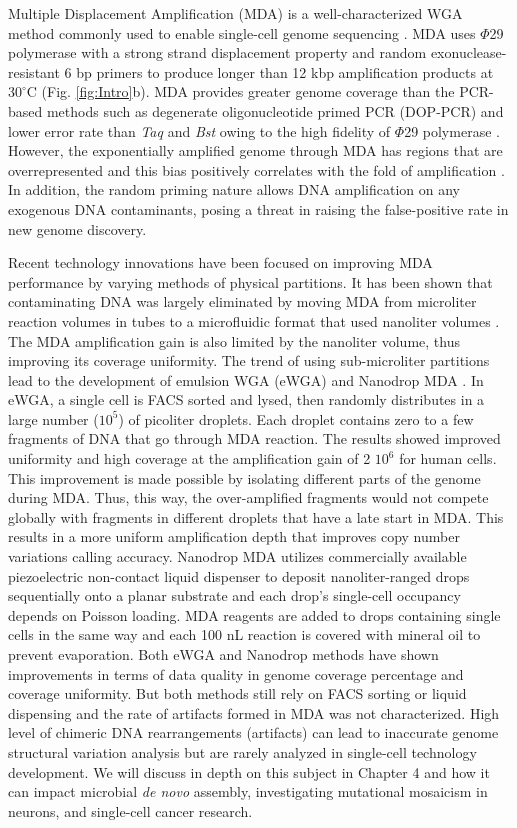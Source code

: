 Multiple Displacement Amplification (MDA) \cite{Dean:2002us} is a well-characterized WGA method commonly used to enable single-cell genome sequencing \cite{Marcy:2007il,Fu:2015gl,Zhang:2006hq,Raghunathan:2005fg,Pamp:2012cj,Dodsworth:2013ih,Hess:2011gu}. MDA uses $\Phi$29 polymerase with a strong strand displacement property and random exonuclease-resistant 6 bp primers to produce longer than 12 kbp amplification products at $30^{\circ}$C (Fig. \ref{fig:Intro}b). MDA provides greater genome coverage than the PCR-based methods such as degenerate oligonucleotide primed PCR (DOP-PCR) and lower error rate than \textit{Taq} and \textit{Bst} owing to the high fidelity of $\Phi$29 polymerase \cite{Dean:2002us}. However, the exponentially amplified genome through MDA has regions that are overrepresented and this bias positively correlates with the fold of amplification \cite{deBourcy:2014ji}. In addition, the random priming nature allows DNA amplification on any exogenous DNA contaminants, posing a threat in raising the false-positive rate in new genome discovery. 

Recent technology innovations have been focused on improving MDA performance by varying methods of physical partitions. It has been shown that contaminating DNA was largely eliminated by moving MDA from microliter reaction volumes in tubes to a microfluidic format that used nanoliter volumes \cite{deBourcy:2014ji}. The MDA amplification gain is also limited by the nanoliter volume, thus improving its coverage uniformity. The trend of using sub-microliter partitions lead to the development of emulsion WGA (eWGA) \cite{Fu:2015gl} and Nanodrop MDA \cite{Leung:2016vx}. In eWGA, a single cell is FACS sorted and lysed, then randomly distributes in a large number ($10^5$) of picoliter droplets. Each droplet contains zero to a few fragments of DNA that go through MDA reaction. The results showed improved uniformity and high coverage at the amplification gain of 2 \times $10^6$ for human cells. This improvement is made possible by isolating different parts of the genome during MDA. Thus, this way, the over-amplified fragments would not compete globally with fragments in different droplets that have a late start in MDA. This results in a more uniform amplification depth that improves copy number variations calling accuracy. Nanodrop MDA utilizes commercially available piezoelectric non-contact liquid dispenser to deposit nanoliter-ranged drops sequentially onto a planar substrate and each drop's single-cell occupancy depends on Poisson loading. MDA reagents are added to drops containing single cells in the same way and each 100 nL reaction is covered with mineral oil to prevent evaporation. Both eWGA and Nanodrop methods have shown improvements in terms of data quality in genome coverage percentage and coverage uniformity. But both methods still rely on FACS sorting or liquid dispensing and the rate of artifacts formed in MDA was not characterized. High level of chimeric DNA rearrangements (artifacts) can lead to inaccurate genome structural variation analysis but are rarely analyzed in single-cell technology development. We will discuss in depth on this subject in Chapter 4 and how it can impact microbial \textit{de novo} assembly, investigating mutational mosaicism in neurons, and single-cell cancer research. 

